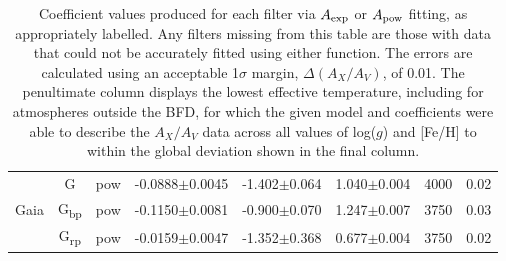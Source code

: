 \documentclass[12pt, a4paper]{report}
\begin{document}
\begin{table}
\begin{center}
{\begin{tabular}{cccccccc}
& G & pow & -0.0888$\pm$0.0045 & -1.402$\pm$0.064 & 1.040$\pm$0.004 & 4000 & 0.02 \\
Gaia & G\textsubscript{bp} & pow & -0.1150$\pm$0.0081 & -0.900$\pm$0.070 & 1.247$\pm$0.007 & 3750 & 0.03 \\
& G\textsubscript{rp} & pow & -0.0159$\pm$0.0047 & -1.352$\pm$0.368 & 0.677$\pm$0.004 & 3750 & 0.02 \\ \hline

\end{tabular}}
\caption{Coefficient values produced for each filter via $A_{\textnormal{exp}}$ or $A_{\textnormal{pow}}$ fitting, as appropriately labelled. Any filters missing from this table are those with data that could not be accurately fitted using either function. The errors are calculated using an acceptable 1$\sigma$ margin, $\Delta(A_{X}/A_{V})$, of 0.01. The penultimate column displays the lowest effective temperature, including for atmospheres outside the BFD, for which the given model and coefficients were able to describe the $A_{X}/A_{V}$ data across all values of log($g$) and [Fe/H] to within the global deviation shown in the final column.}
\label{simpfunc_coeffs_table}
\end{center}
\end{table}
\end{document}
